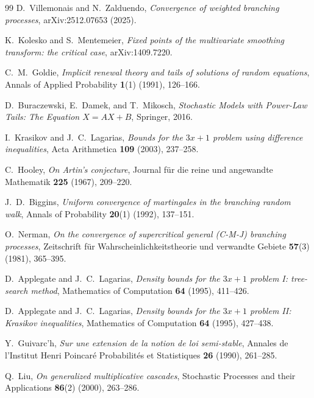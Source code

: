 \documentclass[11pt]{article}
\theoremstyle{definition}
\theoremstyle{remark}
\begin{document}
\begin{thebibliography}{99}
 D.\ Villemonais and N.\ Zalduendo,
  \emph{Convergence of weighted branching processes}, arXiv:2512.07653
  (2025).

 K.\ Kolesko and S.\ Mentemeier,
  \emph{Fixed points of the multivariate smoothing transform: the
  critical case}, arXiv:1409.7220.

 C.\ M.\ Goldie, \emph{Implicit renewal theory and
  tails of solutions of random equations}, Annals of Applied
  Probability \textbf{1}(1) (1991), 126--166.

 D.\ Buraczewski, E.\ Damek, and
  T.\ Mikosch, \emph{Stochastic Models with Power-Law Tails: The
  Equation $X=AX+B$}, Springer, 2016.

 I.\ Krasikov and J.\ C.\ Lagarias,
  \emph{Bounds for the $3x+1$ problem using difference inequalities},
  Acta Arithmetica \textbf{109} (2003), 237--258.

 C.\ Hooley, \emph{On Artin's conjecture}, Journal
  f\"ur die reine und angewandte Mathematik \textbf{225} (1967),
  209--220.

 J.\ D.\ Biggins, \emph{Uniform convergence of
  martingales in the branching random walk}, Annals of Probability
  \textbf{20}(1) (1992), 137--151.

 O.\ Nerman, \emph{On the convergence of
  supercritical general (C-M-J) branching processes}, Zeitschrift
  f\"ur Wahrscheinlichkeitstheorie und verwandte Gebiete
  \textbf{57}(3) (1981), 365--395.

 D.\ Applegate and J.\ C.\ Lagarias,
  \emph{Density bounds for the $3x+1$ problem I: tree-search method},
  Mathematics of Computation \textbf{64} (1995), 411--426.

 D.\ Applegate and J.\ C.\ Lagarias,
  \emph{Density bounds for the $3x+1$ problem II: Krasikov
  inequalities}, Mathematics of Computation \textbf{64} (1995),
  427--438.

 Y.\ Guivarc'h, \emph{Sur une extension de la
  notion de loi semi-stable}, Annales de l'Institut Henri Poincaré
  Probabilités et Statistiques \textbf{26} (1990), 261--285.

 Q.\ Liu, \emph{On generalized multiplicative
  cascades}, Stochastic Processes and their Applications
  \textbf{86}(2) (2000), 263--286.


\end{thebibliography}
\end{document}
